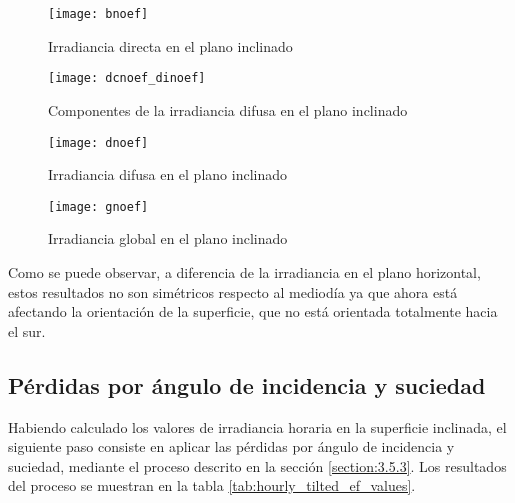 \begin{figure}[H]
\texttt{[image: bnoef]}
\centering
\caption{Irradiancia directa  en el plano inclinado}
\label{fig:hourly_bef}
\end{figure}

\begin{figure}[H]
\texttt{[image: dcnoef\_dinoef]}
\centering
\caption{Componentes de la irradiancia difusa en el plano inclinado}
\label{fig:hourly_bef}
\end{figure}

\begin{figure}[H]
\texttt{[image: dnoef]}
\centering
\caption{Irradiancia difusa en el plano inclinado}
\label{fig:hourly_bef}
\end{figure}

\begin{figure}[H]
\texttt{[image: gnoef]}
\centering
\caption{Irradiancia global en el plano inclinado}
\label{fig:hourly_bef}
\end{figure}


Como se  puede observar, a diferencia de la irradiancia en el plano horizontal, estos resultados no son simétricos respecto al mediodía ya que ahora está afectando la orientación de la superficie, que no está orientada totalmente hacia el sur.

\subsection{Pérdidas por ángulo de incidencia y suciedad}

Habiendo calculado los valores de irradiancia horaria en la superficie inclinada, el siguiente paso consiste en aplicar las pérdidas por ángulo de incidencia y suciedad, mediante el proceso descrito en la sección \ref{section:3.5.3}. Los resultados del proceso se muestran en la tabla \ref{tab:hourly_tilted_ef_values}.

